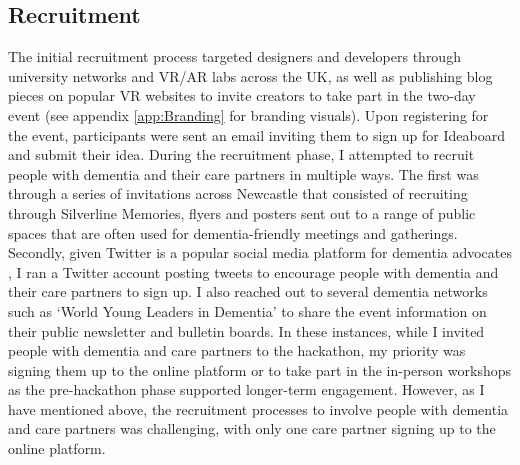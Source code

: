 \subsection{Recruitment}
\label{sec:EventRecruitment}
The initial recruitment process targeted designers and developers through university networks and VR/AR labs across the UK, as well as publishing blog pieces on popular VR websites to invite creators to take part in the two-day event (see appendix \ref{app:Branding} for branding visuals). Upon registering for the event, participants were sent an email inviting them to sign up for Ideaboard and submit their idea. During the recruitment phase, I attempted to recruit people with dementia and their care partners in multiple ways. The first was through a series of invitations across Newcastle that consisted of recruiting through Silverline Memories, flyers and posters sent out to a range of public spaces that are often used for dementia-friendly meetings and gatherings. Secondly, given Twitter is a popular social media platform for dementia advocates \citep{talbot_how_2020}, I ran a Twitter account posting tweets to encourage people with dementia and their care partners to sign up. I also reached out to several dementia networks such as `World Young Leaders in Dementia' to share the event information on their public newsletter and bulletin boards. In these instances, while I invited people with dementia and care partners to the hackathon, my priority was signing them up to the online platform or to take part in the in-person workshops as the pre-hackathon phase supported longer-term engagement. However, as I have mentioned above, the recruitment processes to involve people with dementia and care partners was challenging, with only one care partner signing up to the online platform.

